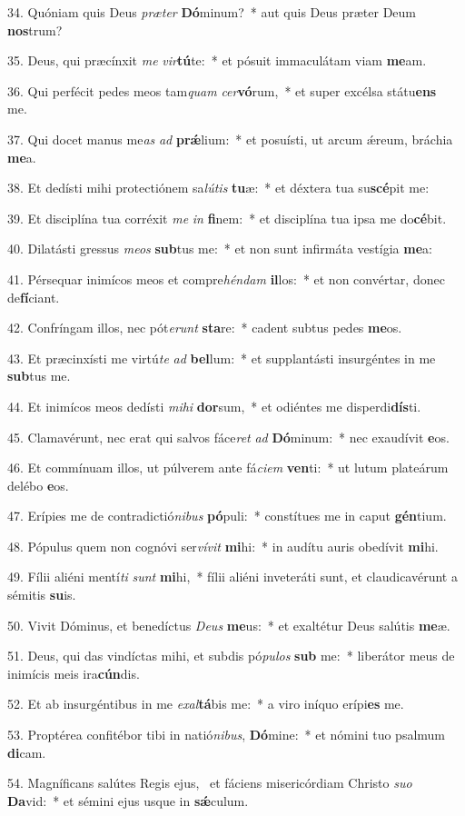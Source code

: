 34. Quóniam quis Deus \textit{præ}\textit{ter} \textbf{Dó}minum?~*  aut quis Deus præter Deum \textbf{nos}trum?\

35. Deus, qui præcínxit \textit{me} \textit{vir}\textbf{tú}te:~*  et pósuit immaculátam viam \textbf{me}am.\

36. Qui perfécit pedes meos tam\textit{quam} \textit{cer}\textbf{vó}rum,~*  et super excélsa státu\textbf{ens} me.\

37. Qui docet manus me\textit{as} \textit{ad} \textbf{prǽ}lium:~*  et posuísti, ut arcum ǽreum, bráchia \textbf{me}a.\

38. Et dedísti mihi protectiónem sa\textit{lú}\textit{tis} \textbf{tu}æ:~*  et déxtera tua su\textbf{scé}pit me:\

39. Et disciplína tua corréxit \textit{me} \textit{in} \textbf{fi}nem:~*  et disciplína tua ipsa me do\textbf{cé}bit.\

40. Dilatásti gressus \textit{me}\textit{os} \textbf{sub}tus me:~*  et non sunt infirmáta vestígia \textbf{me}a:\

41. Pérsequar inimícos meos et compre\textit{hén}\textit{dam} \textbf{il}los:~*  et non convértar, donec de\textbf{fí}ciant.\

42. Confríngam illos, nec pót\textit{e}\textit{runt} \textbf{sta}re:~*  cadent subtus pedes \textbf{me}os.\

43. Et præcinxísti me virtú\textit{te} \textit{ad} \textbf{bel}lum:~*  et supplantásti insurgéntes in me \textbf{sub}tus me.\

44. Et inimícos meos dedísti \textit{mi}\textit{hi} \textbf{dor}sum,~*  et odiéntes me disperdi\textbf{dís}ti.\

45. Clamavérunt, nec erat qui salvos fáce\textit{ret} \textit{ad} \textbf{Dó}minum:~*  nec exaudívit \textbf{e}os.\

46. Et commínuam illos, ut púlverem ante fá\textit{ci}\textit{em} \textbf{ven}ti:~*  ut lutum plateárum delébo \textbf{e}os.\

47. Erípies me de contradictió\textit{ni}\textit{bus} \textbf{pó}puli:~*  constítues me in caput \textbf{gén}tium.\

48. Pópulus quem non cognóvi ser\textit{ví}\textit{vit} \textbf{mi}hi:~*  in audítu auris obedívit \textbf{mi}hi.\

49. Fílii aliéni mentí\textit{ti} \textit{sunt} \textbf{mi}hi,~*  fílii aliéni inveteráti sunt, et claudicavérunt a sémitis \textbf{su}is.\

50. Vivit Dóminus, et benedíctus \textit{De}\textit{us} \textbf{me}us:~*  et exaltétur Deus salútis \textbf{me}æ.\

51. Deus, qui das vindíctas mihi, et subdis pó\textit{pu}\textit{los} \textbf{sub} me:~*  liberátor meus de inimícis meis ira\textbf{cún}dis.\

52. Et ab insurgéntibus in me \textit{ex}\textit{al}\textbf{tá}bis me:~*  a viro iníquo erípi\textbf{es} me.\

53. Proptérea confitébor tibi in natió\textit{ni}\textit{bus}, \textbf{Dó}mine:~*  et nómini tuo psalmum \textbf{di}cam.\

54. Magníficans salútes Regis ejus, \dag\  et fáciens misericórdiam Christo \textit{su}\textit{o} \textbf{Da}vid:~*  et sémini ejus usque in \textbf{sǽ}culum.\

